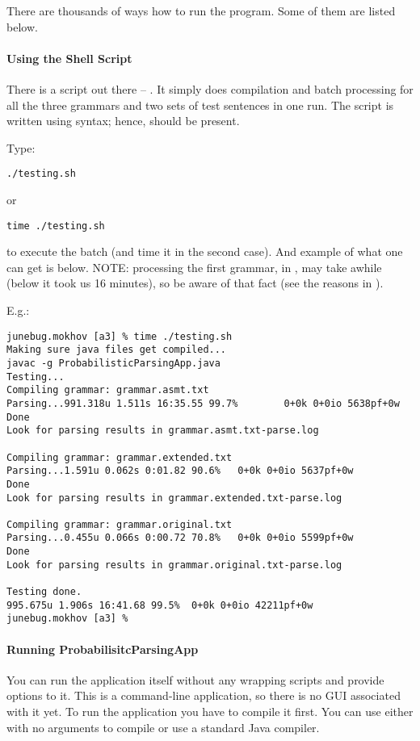 There are thousands of ways how to run the program. Some of them are listed below.

\paragraph*{Using the Shell Script}

There is a script out there -- . It simply does compilation
and batch processing for all the three grammars and two sets of test
sentences in one run.
The script is written using  syntax; hence,  should be
present.

Type:

\noindent
\verb+./testing.sh+

or

\noindent
\verb+time ./testing.sh+

to execute  the batch (and time it in the second case). And example
of what one can get is below. NOTE: processing the first grammar, in
, may take awhile (below it took us 16 minutes),
so be aware of that fact (see the reasons in ).

E.g.:

\begin{verbatim}
junebug.mokhov [a3] % time ./testing.sh
Making sure java files get compiled...
javac -g ProbabilisticParsingApp.java
Testing...
Compiling grammar: grammar.asmt.txt
Parsing...991.318u 1.511s 16:35.55 99.7%        0+0k 0+0io 5638pf+0w
Done
Look for parsing results in grammar.asmt.txt-parse.log

Compiling grammar: grammar.extended.txt
Parsing...1.591u 0.062s 0:01.82 90.6%   0+0k 0+0io 5637pf+0w
Done
Look for parsing results in grammar.extended.txt-parse.log

Compiling grammar: grammar.original.txt
Parsing...0.455u 0.066s 0:00.72 70.8%   0+0k 0+0io 5599pf+0w
Done
Look for parsing results in grammar.original.txt-parse.log

Testing done.
995.675u 1.906s 16:41.68 99.5%  0+0k 0+0io 42211pf+0w
junebug.mokhov [a3] %
\end{verbatim}

\paragraph*{Running ProbabilisitcParsingApp}
\label{sect:prob-parsing-app}

You can run the application itself without any wrapping scripts
and provide options to it. This is a command-line application,
so there is no GUI associated with it yet. To run the application
you have to compile it first. You can use either  with no
arguments to compile or use a standard Java compiler.

